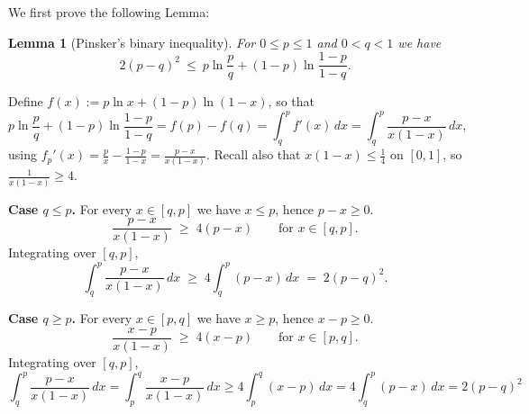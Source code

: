 \documentclass[fontsize=11pt, parskip=half]{scrartcl}
\newtheorem{lemma}[theorem]{Lemma}
\theoremstyle{definition}
\newcommand{\mysubsection}[2]{\par\medskip\noindent\refstepcounter{subsection}\textbf{\thesubsection.}~#2\par\smallskip}
\begin{document}
We first prove the following Lemma:

\begin{lemma}[Pinsker's binary inequality]\label{lem:pinsker_binary}
    For $0 \leq p \leq 1$ and $0 < q < 1$ we have
    \[
        2(p-q)^2 ~\leq~ p \ln \frac{p}{q} + (1-p) \ln \frac{1-p}{1-q}.
    \]
    \end{lemma}
    
    
    
    
    Define $f(x) := p \ln x + (1-p) \ln (1-x)$, so that
    \[
    p \ln \frac{p}{q} + (1-p) \ln \frac{1-p}{1-q} = f(p) - f(q)
    = \int_q^p f'(x)\, dx
    = \int_q^p \frac{p-x}{x(1-x)}\, dx,
    \]
    using $f_p'(x) = \frac{p}{x} - \frac{1-p}{1-x} = \frac{p-x}{x(1-x)}$. Recall also that $x(1-x) \leq \tfrac14$ on $[0,1]$, so $\frac{1}{x(1-x)} \geq 4$.
    
    \textbf{Case $q \leq p$.} For every $x \in [q,p]$ we have $x \leq p$, hence $p - x \geq 0$.
    \[
    \frac{p-x}{x(1-x)} \;\geq\; 4(p-x) \qquad \text{for } x \in [q,p].
    \]
    Integrating over $[q,p]$,
    \[
    \int_q^p \frac{p-x}{x(1-x)}\, dx \;\geq\; 4 \int_q^p (p-x)\, dx \;=\; 2(p-q)^2.
    \]
    
    \textbf{Case $q \geq p$.} For every $x \in [p,q]$ we have $x \geq p$, hence $x - p \geq 0$. 
    \[
    \frac{x-p}{x(1-x)} \;\geq\; 4(x-p) \qquad \text{for } x \in [p,q].
    \]
    Integrating over $[q,p]$,
    \[
    \int_q^p \frac{p-x}{x(1-x)}\, dx
    = \int_p^q \frac{x-p}{x(1-x)}\, dx
    \geq 4 \int_p^q (x-p)\, dx
    = 4 \int_q^p (p-x)\, dx
    = 2(p-q)^2
    \]
\end{document}

